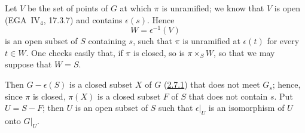 Let \(V\) be the set of points of \(G\) at which \(\pi\) is
unramified; we know that \(V\) is open (EGA~IV\(_4\), 17.3.7) and contains
\(\epsilon(s)\). Hence
\[
  W=\epsilon^{-1}(V)
\]
is an open subset of \(S\) containing \(s\), such that \(\pi\) is
unramified at \(\epsilon(t)\) for every \(t\in W\). One checks easily
that, if \(\pi\) is closed, so is \(\pi\times_SW\), so that we may
suppose that \(W=S\).

Then \(G-\epsilon(S)\) is a closed subset \(X\) of \(G\)
(\hyperref[lem:sga3-VIB-2.7.1]{2.7.1}) that does not meet \(G_s\); hence, since \(\pi\) is closed,
\(\pi(X)\) is a closed subset \(F\) of \(S\) that does not contain \(s\).
Put \(U=S-F\); then \(U\) is an open subset of \(S\) such that
\(\epsilon|_U\) is an isomorphism of \(U\) onto \(G|_U\).

